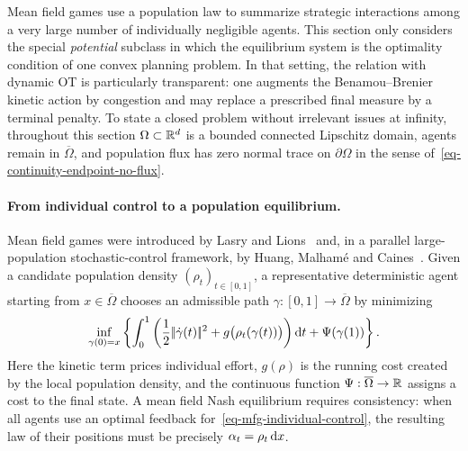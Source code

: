 Mean field games use a population law to summarize strategic interactions among a very large number of individually negligible agents. This section only considers the special \emph{potential} subclass in which the equilibrium system is the optimality condition of one convex planning problem. In that setting, the relation with dynamic OT is particularly transparent: one augments the Benamou--Brenier kinetic action by congestion and may replace a prescribed final measure by a terminal penalty. To state a closed problem without irrelevant issues at infinity, throughout this section $\Omega\subset\mathbb{R}^d$ is a bounded connected Lipschitz domain, agents remain in $\overline\Omega$, and population flux has zero normal trace on $\partial\Omega$ in the sense of~\eqref{eq-continuity-endpoint-no-flux}.

\paragraph{From individual control to a population equilibrium.}
Mean field games were introduced by Lasry and Lions~\cite{LasryLions2007MeanFieldGames} and, in a parallel large-population stochastic-control framework, by Huang, Malham\'e and Caines~\cite{HuangMalhameCaines2006}. Given a candidate population density $(\rho_t)_{t\in[0,1]}$, a representative deterministic agent starting from $x\in\overline\Omega$ chooses an admissible path $\gamma:[0,1]\to\overline\Omega$ by minimizing
\begin{equation}\label{eq-mfg-individual-control}
	\inf_{\gamma(0)=x}
	\left\{
		\int_0^1
		\left(
			\frac12|\!| \dot\gamma(t) |\!|^2
			+g\bigl(\rho_t(\gamma(t))\bigr)
		\right)\mathrm{d} t
		+\Psi(\gamma(1))
	\right\}.
\end{equation}
Here the kinetic term prices individual effort, $g(\rho)$ is the running cost created by the local population density, and the continuous function $\Psi:\overline\Omega\to\mathbb{R}$ assigns a cost to the final state. A mean field Nash equilibrium requires consistency: when all agents use an optimal feedback for~\eqref{eq-mfg-individual-control}, the resulting law of their positions must be precisely $\alpha_t=\rho_t\,\mathrm{d} x$.

